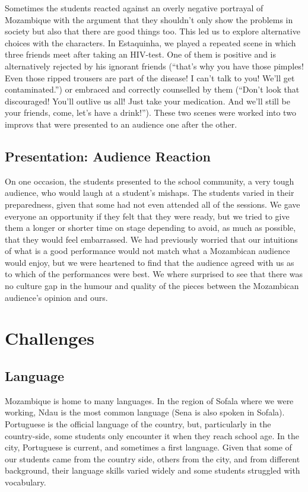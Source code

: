 \documentclass[article,twocolumn,twoside]{memoir}
\begin{document}
Sometimes the students reacted against an overly negative portrayal of
Mozambique with the argument that they shouldn't only show the problems in
society but also that there are good things too. This led us to explore
alternative choices with the characters. In Estaquinha, we played a repeated
scene in which three friends meet after taking an HIV-test. One of them is
positive and is alternatively rejected by his ignorant friends (``that's why
you have those pimples! Even those ripped trousers are part of the disease! I
can't talk to you! We'll get contaminated.'') or embraced and correctly
counselled by them (``Don't look that discouraged! You'll outlive us all! Just
take your medication. And we'll still be your friends, come, let's have a
drink!''). These two scenes were worked into two improvs that were presented to
an audience one after the other.

\section{Presentation: Audience Reaction}

On one occasion, the students presented to the school community, a very tough
audience, who would laugh at a student's mishaps. The students varied in their
preparedness, given that some had not even attended all of the sessions. We
gave everyone an opportunity if they felt that they were ready, but we tried to
give them a longer or shorter time on stage depending to avoid, as much as
possible, that they would feel embarrassed. We had previously worried that our
intuitions of what is a good performance would not match what a Mozambican
audience would enjoy, but we were heartened to find that the audience agreed
with us as to which of the performances were best. We where surprised to see
that there was no culture gap in the humour and quality of the pieces between
the Mozambican audience's opinion and ours.

\chapter{Challenges}
\section{Language}

Mozambique is home to many languages. In the region of Sofala where we were
working, Ndau is the most common language (Sena is also spoken in Sofala).
Portuguese is the official language of the country, but, particularly in the
country-side, some students only encounter it when they reach school age. In
the city, Portuguese is current, and sometimes a first language. Given that
some of our students came from the country side, others from the city, and from
different background, their language skills varied widely and some students
struggled with vocabulary.
\end{document}
